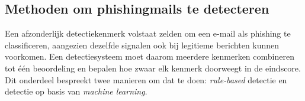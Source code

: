 \subsection{Methoden om phishingmails te detecteren}
\label{subsec:methoden-detectie}

Een afzonderlijk detectiekenmerk volstaat zelden om een e-mail als phishing te classificeren, aangezien dezelfde signalen ook bij legitieme berichten kunnen voorkomen. Een detectiesysteem moet daarom meerdere kenmerken combineren tot één beoordeling en bepalen hoe zwaar elk kenmerk doorweegt in de eindscore. Dit onderdeel bespreekt twee manieren om dat te doen: \emph{rule-based} detectie en detectie op basis van \emph{machine learning}.



